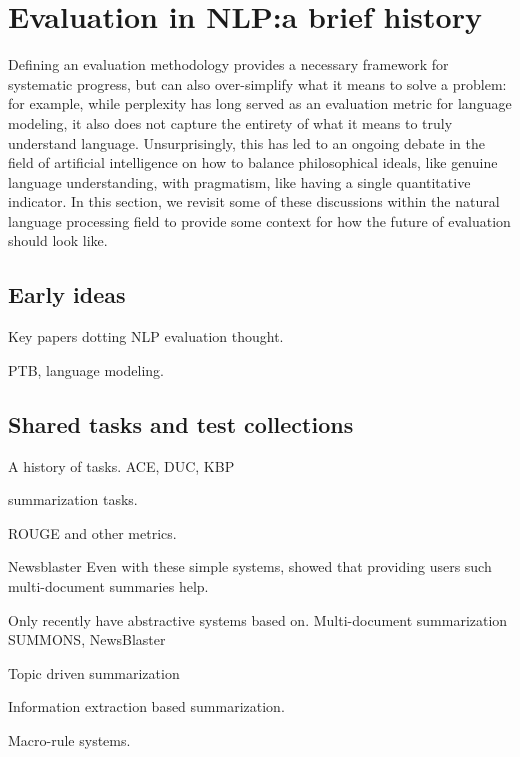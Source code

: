 \section{\label{sec:setup:history}Evaluation in NLP:\@ a brief history}

Defining an evaluation methodology provides a necessary framework for systematic progress, but can also over-simplify what it means to solve a problem: for example, while perplexity has long served as an evaluation metric for language modeling, it also does not capture the entirety of what it means to truly understand language.
Unsurprisingly, this has led to an ongoing debate in the field of artificial intelligence on how to balance philosophical ideals, like genuine language understanding, with pragmatism, like having a single quantitative indicator.
In this section, we revisit some of these discussions within the natural language processing field to provide some context for how the future of evaluation should look like.

\subsection{Early ideas}
Key papers dotting NLP evaluation thought.

PTB, language modeling.


\subsection{Shared tasks and test collections}
A history of tasks.
ACE, DUC, KBP

summarization tasks.



ROUGE and other metrics.


Newsblaster
Even with these simple systems, \citet{mckeown2005summaries} showed that providing users such multi-document summaries help.

Only recently have abstractive systems based on.
Multi-document summarization SUMMONS, NewsBlaster

Topic driven summarization

Information extraction based summarization.


Macro-rule systems.


